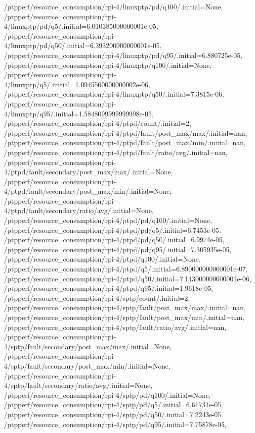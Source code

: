 {    /ptpperf/resource_consumption/rpi-4/linuxptp/pd/q100/.initial=None,
    /ptpperf/resource_consumption/rpi-4/linuxptp/pd/q5/.initial=6.010385000000001e-05,
    /ptpperf/resource_consumption/rpi-4/linuxptp/pd/q50/.initial=6.393200000000001e-05,
    /ptpperf/resource_consumption/rpi-4/linuxptp/pd/q95/.initial=6.880725e-05,
    /ptpperf/resource_consumption/rpi-4/linuxptp/q100/.initial=None,
    /ptpperf/resource_consumption/rpi-4/linuxptp/q5/.initial=1.0945500000000002e-06,
    /ptpperf/resource_consumption/rpi-4/linuxptp/q50/.initial=7.3815e-06,
    /ptpperf/resource_consumption/rpi-4/linuxptp/q95/.initial=1.5848099999999998e-05,
    /ptpperf/resource_consumption/rpi-4/ptpd/count/.initial=2,
    /ptpperf/resource_consumption/rpi-4/ptpd/fault/post_max/max/.initial=nan,
    /ptpperf/resource_consumption/rpi-4/ptpd/fault/post_max/min/.initial=nan,
    /ptpperf/resource_consumption/rpi-4/ptpd/fault/ratio/avg/.initial=nan,
    /ptpperf/resource_consumption/rpi-4/ptpd/fault/secondary/post_max/max/.initial=None,
    /ptpperf/resource_consumption/rpi-4/ptpd/fault/secondary/post_max/min/.initial=None,
    /ptpperf/resource_consumption/rpi-4/ptpd/fault/secondary/ratio/avg/.initial=None,
    /ptpperf/resource_consumption/rpi-4/ptpd/pd/q100/.initial=None,
    /ptpperf/resource_consumption/rpi-4/ptpd/pd/q5/.initial=6.7453e-05,
    /ptpperf/resource_consumption/rpi-4/ptpd/pd/q50/.initial=6.9974e-05,
    /ptpperf/resource_consumption/rpi-4/ptpd/pd/q95/.initial=7.305935e-05,
    /ptpperf/resource_consumption/rpi-4/ptpd/q100/.initial=None,
    /ptpperf/resource_consumption/rpi-4/ptpd/q5/.initial=6.890000000000001e-07,
    /ptpperf/resource_consumption/rpi-4/ptpd/q50/.initial=7.143000000000001e-06,
    /ptpperf/resource_consumption/rpi-4/ptpd/q95/.initial=1.9618e-05,
    /ptpperf/resource_consumption/rpi-4/sptp/count/.initial=2,
    /ptpperf/resource_consumption/rpi-4/sptp/fault/post_max/max/.initial=nan,
    /ptpperf/resource_consumption/rpi-4/sptp/fault/post_max/min/.initial=nan,
    /ptpperf/resource_consumption/rpi-4/sptp/fault/ratio/avg/.initial=nan,
    /ptpperf/resource_consumption/rpi-4/sptp/fault/secondary/post_max/max/.initial=None,
    /ptpperf/resource_consumption/rpi-4/sptp/fault/secondary/post_max/min/.initial=None,
    /ptpperf/resource_consumption/rpi-4/sptp/fault/secondary/ratio/avg/.initial=None,
    /ptpperf/resource_consumption/rpi-4/sptp/pd/q100/.initial=None,
    /ptpperf/resource_consumption/rpi-4/sptp/pd/q5/.initial=6.61734e-05,
    /ptpperf/resource_consumption/rpi-4/sptp/pd/q50/.initial=7.2243e-05,
    /ptpperf/resource_consumption/rpi-4/sptp/pd/q95/.initial=7.75878e-05,
}
